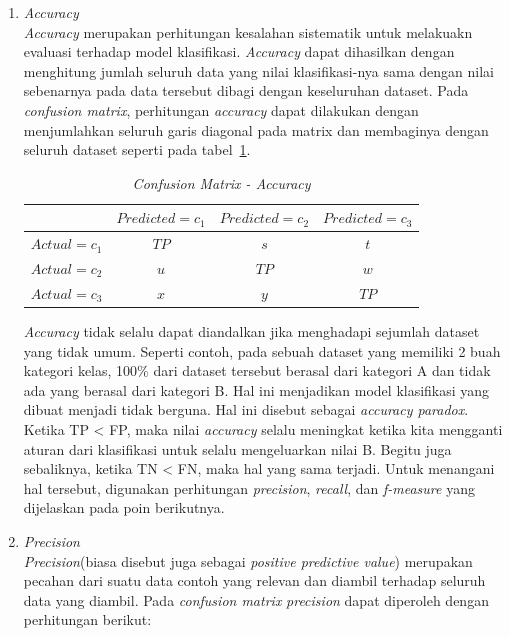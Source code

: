 \begin{enumerate}
	\item \textit{Accuracy}\\
	\textit{Accuracy} merupakan perhitungan kesalahan sistematik untuk melakuakn evaluasi terhadap model klasifikasi. \textit{Accuracy} dapat dihasilkan dengan menghitung jumlah seluruh data yang nilai klasifikasi-nya sama dengan nilai sebenarnya pada data tersebut dibagi dengan keseluruhan dataset. Pada \textit{confusion matrix}, perhitungan \textit{accuracy} dapat dilakukan dengan menjumlahkan seluruh garis diagonal pada matrix dan membaginya dengan seluruh dataset seperti pada tabel~\ref{tab:confusion_accuracy}.
	
\begin{table}[H]
\label{tab:confusion_accuracy}
\centering
\caption{\textit{Confusion Matrix - Accuracy}}
\begin{tabular}{ | c | c | c | c | }
\hline
 & $Predicted=c_1$ & $Predicted=c_2$ & $Predicted=c_3$ \\ \hline \hline
$Actual=c_1$ & $TP$ & $s$ & $t$ \\ \hline
$Actual=c_2$ & $u$ & $TP$ & $w$ \\ \hline
$Actual=c_3$ & $x$ & $y$ & $TP$ \\ \hline
\end{tabular}
\end{table}

	 \textit{Accuracy} tidak selalu dapat diandalkan jika menghadapi sejumlah dataset yang tidak umum. Seperti contoh, pada sebuah dataset yang memiliki 2 buah kategori kelas, 100\% dari dataset tersebut berasal dari kategori A dan tidak ada yang berasal dari kategori B. Hal ini menjadikan model klasifikasi yang dibuat menjadi tidak berguna. Hal ini disebut sebagai \textit{accuracy paradox}. Ketika TP < FP, maka nilai \textit{accuracy} selalu meningkat ketika kita mengganti aturan dari klasifikasi untuk selalu mengeluarkan nilai B. Begitu juga sebaliknya, ketika TN < FN, maka hal yang sama terjadi. Untuk menangani hal tersebut, digunakan perhitungan \textit{precision}, \textit{recall}, dan \textit{f-measure} yang dijelaskan pada poin berikutnya.
	 
	 \item \textit{Precision}\\
	 \textit{Precision}(biasa disebut juga sebagai \textit{positive predictive value}) merupakan pecahan dari suatu data contoh yang relevan dan diambil terhadap seluruh data yang diambil. Pada \textit{confusion matrix} \textit{precision} dapat diperoleh dengan perhitungan berikut:


\end{enumerate}
